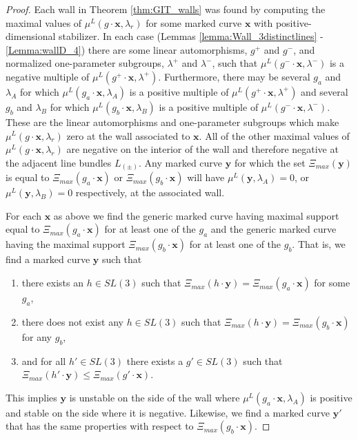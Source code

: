 \documentclass{amsart}
\numberwithin{equation}{section}
\theoremstyle{definition}
\begin{document}
\begin{proof}
    Each wall in Theorem \ref{thm:GIT_walls} was found by computing the maximal values of $\mu^L(g \cdot \mathbf{x}, \lambda_r)$ for some marked curve $\mathbf{x}$ with positive-dimensional stabilizer.  In each case (Lemmas \ref{lemma:Wall_3distinctlines} - \ref{Lemma:wallD_4}) there are some linear automorphisms, $g^+$ and $g^-$, and normalized one-parameter subgroups, $\lambda^+$ and $\lambda^-$, such that $\mu^L(g^- \cdot \mathbf{x}, \lambda^-)$ is a negative multiple of $ \mu^L(g^+ \cdot \mathbf{x}, \lambda^+)$. Furthermore, there may be several $g_a$ and $\lambda_A$ for which $\mu^L(g_a \cdot \mathbf{x}, \lambda_A)$ is a positive multiple of $\mu^L(g^+ \cdot \mathbf{x}, \lambda^+)$ and several $g_b$ and $\lambda_B$ for which $\mu^L(g_b \cdot \mathbf{x}, \lambda_B)$ is a positive multiple of $\mu^L(g^- \cdot \mathbf{x}, \lambda^-)$. These are the linear automorphisms and one-parameter subgroups which make $\mu^L(g \cdot \mathbf{x}, \lambda_r)$ zero at the wall associated to $\mathbf{x}$. All of the other maximal values of $\mu^L( g \cdot \mathbf{x}, \lambda_r)$ are negative on the interior of the wall and therefore negative at the adjacent line bundles $L_{(\pm)}$. Any marked curve $\mathbf{y}$ for which the set $\Xi_{max}(\mathbf{y})$ is equal to $ \Xi_{max}( g_a \cdot \mathbf{x})$ or $\Xi_{max}( g_b \cdot \mathbf{x})$ will have $\mu^L(\mathbf{y}, \lambda_A)=0$, or $\mu^L(\mathbf{y}, \lambda_B)=0$ respectively, at the associated wall.

    For each $\mathbf{x}$ as above we find the generic marked curve having maximal support equal to $ \Xi_{max}( g_a \cdot \mathbf{x})$ for at least one of the $g_a$ and the generic marked curve having the maximal support $\Xi_{max}( g_b \cdot \mathbf{x})$ for at least one of the $g_b$. That is, we find a marked curve $\mathbf{y}$ such that
    \begin{enumerate} 
        \item there exists an $h \in SL(3)$ such that $\Xi_{max}(h \cdot \mathbf{y}) = \Xi_{max}(g_a \cdot \mathbf{x})$ for some $g_a$,
        \item there does not exist any $h \in SL(3)$ such that $\Xi_{max}(h \cdot \mathbf{y}) = \Xi_{max}(g_b \cdot \mathbf{x})$ for any $g_b$,
        \item and for all $h' \in SL(3)$ there exists a $g' \in SL(3)$ such that $\Xi_{max} (h' \cdot \mathbf{y}) \leq \Xi_{max}(g' \cdot \mathbf{x})$.
    \end{enumerate}
     This implies $\mathbf{y}$ is unstable on the side of the wall where $\mu^L(g_a \cdot \mathbf{x}, \lambda_A)$ is positive and stable on the side where it is negative. Likewise, we find a marked curve $\mathbf{y'}$ that has the same properties with respect to $\Xi_{max}(g_b \cdot \mathbf{x}).$


\end{proof}
\end{document}
